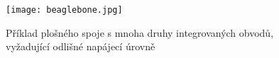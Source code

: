     \begin{figure}[ht!]
      \centering
      \texttt{[image: beaglebone.jpg]}
      \caption{Příklad plošného spoje s mnoha druhy integrovaných obvodů, vyžadující odlišné 
               napájecí úrovně}
      \label{SPICE:Basso_intro}
    \end{figure}

